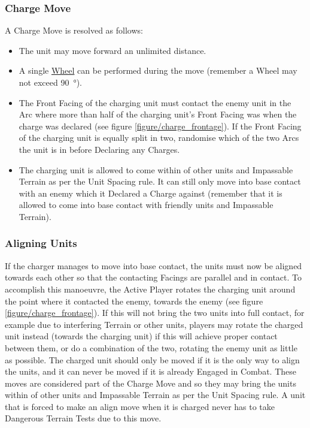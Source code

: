 \subsubsection{Charge Move}
\label{charge_move}

A Charge Move is resolved as follows:
\begin{itemize}[label={-}]
\item The unit may move forward an unlimited distance.
\item A single \hyperref[pivots_and_wheels]{Wheel} can be performed during the move (remember a Wheel may not exceed \SI{90}{\degree}).
\item The Front Facing of the charging unit must contact the enemy unit in the Arc where more than half of the charging unit's Front Facing was when the charge was declared (see figure \ref{figure/charge_frontage}). If the Front Facing of the charging unit is equally split in two, randomise which of the two Arcs the unit is in before Declaring any Charges.
\item The charging unit is allowed to come within  of other units and Impassable Terrain as per the Unit Spacing rule. It can still only move into base contact with an enemy which it Declared a Charge against (remember that it is allowed to come into base contact with friendly units and Impassable Terrain).
\end{itemize}

\subsubsection{Aligning Units}
\label{aligning_units}

If the charger manages to move into base contact, the units must now be aligned towards each other so that the contacting Facings are parallel and in contact. To accomplish this manoeuvre, the Active Player rotates the charging unit around the point where it contacted the enemy, towards the enemy (see figure \ref{figure/charge_frontage}). If this will not bring the two units into full contact, for example due to interfering Terrain or other units, players may rotate the charged unit instead (towards the charging unit) if this will achieve proper contact between them, or do a combination of the two, rotating the enemy unit as little as possible. The charged unit should only be moved if it is the only way to align the units, and it can never be moved if it is already Engaged in Combat. These moves are considered part of the Charge Move and so they may bring the units within  of other units and Impassable Terrain as per the Unit Spacing rule. A unit that is forced to make an align move when it is charged never has to take Dangerous Terrain Tests due to this move.

